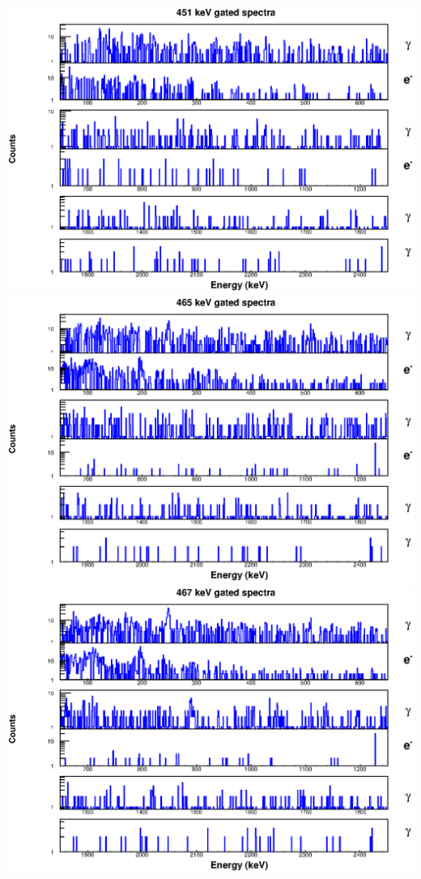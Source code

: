 \begin{landscape}
\includegraphics[scale=1.1]{154Gd_Appendix/451_combined.eps}
\includegraphics[scale=1.1]{154Gd_Appendix/465_combined.eps}
\includegraphics[scale=1.1]{154Gd_Appendix/467_combined.eps}

\end{landscape}
